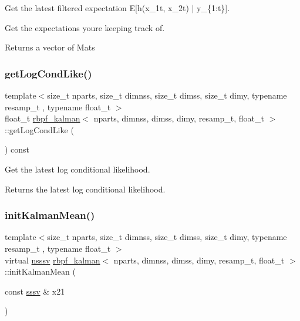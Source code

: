 Get the latest filtered expectation E\mbox{[}h(x\+\_\+1t, x\+\_\+2t) $\vert$ y\+\_\+\{1\+:t\}\mbox{]}. 

Get the expectations you\textquotesingle{}re keeping track of. \begin{DoxyReturn}{Returns}
a vector of Mats 
\end{DoxyReturn}
\mbox{\label{classrbpf__kalman_a90d76b85bf97e0f774788e5ccc3aaf8b}} 
\subsubsection{\texorpdfstring{get\+Log\+Cond\+Like()}{getLogCondLike()}}
{\footnotesize\ttfamily template$<$size\+\_\+t nparts, size\+\_\+t dimnss, size\+\_\+t dimss, size\+\_\+t dimy, typename resamp\+\_\+t , typename float\+\_\+t $>$ \\
float\+\_\+t \hyperlink{classrbpf__kalman}{rbpf\+\_\+kalman}$<$ nparts, dimnss, dimss, dimy, resamp\+\_\+t, float\+\_\+t $>$\+::get\+Log\+Cond\+Like (\begin{DoxyParamCaption}{ }\end{DoxyParamCaption}) const}



Get the latest log conditional likelihood. 

\begin{DoxyReturn}{Returns}
the latest log conditional likelihood. 
\end{DoxyReturn}
\mbox{\label{classrbpf__kalman_a799862d3fb775aed84ce58e00dbce458}} 
\subsubsection{\texorpdfstring{init\+Kalman\+Mean()}{initKalmanMean()}}
{\footnotesize\ttfamily template$<$size\+\_\+t nparts, size\+\_\+t dimnss, size\+\_\+t dimss, size\+\_\+t dimy, typename resamp\+\_\+t , typename float\+\_\+t $>$ \\
virtual \hyperlink{classrbpf__kalman_aea6e6dd087b2fca63be4e480dcf0d1c3}{nsssv} \hyperlink{classrbpf__kalman}{rbpf\+\_\+kalman}$<$ nparts, dimnss, dimss, dimy, resamp\+\_\+t, float\+\_\+t $>$\+::init\+Kalman\+Mean (\begin{DoxyParamCaption}\item[{const \hyperlink{classrbpf__kalman_a616e56c08c1a6b476e065b2200433915}{sssv} \&}]{x21 }\end{DoxyParamCaption})\hspace{0.3cm}{\ttfamily [pure virtual]}}



